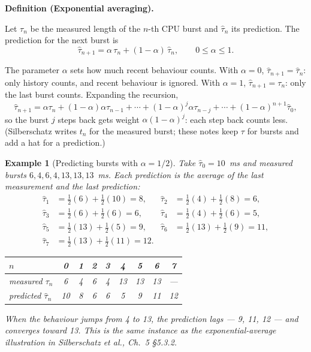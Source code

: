 \documentclass[11pt]{article}
\newtheorem{example}{Example}
\newenvironment{definitionbox}[1]{%
  \par\noindent\textbf{Definition (#1).}\ \itshape
}{\par\vspace{0.3em}}
\begin{document}
\begin{definitionbox}{Exponential averaging}
Let $\tau_n$ be the measured length of the $n$-th CPU burst and $\hat{\tau}_n$
its prediction. The prediction for the next burst is
\[
  \hat{\tau}_{n+1} = \alpha\,\tau_n + (1-\alpha)\,\hat{\tau}_n ,
  \qquad 0 \le \alpha \le 1 .
\]
\end{definitionbox}

The parameter $\alpha$ sets how much recent behaviour counts. With $\alpha = 0$,
$\hat{\tau}_{n+1} = \hat{\tau}_n$: only history counts, and recent behaviour is
ignored. With $\alpha = 1$, $\hat{\tau}_{n+1} = \tau_n$: only the last burst
counts. Expanding the recursion,
\[
  \hat{\tau}_{n+1} = \alpha\tau_n + (1-\alpha)\alpha\tau_{n-1} + \cdots
    + (1-\alpha)^j\alpha\tau_{n-j} + \cdots + (1-\alpha)^{n+1}\hat{\tau}_0 ,
\]
so the burst $j$ steps back gets weight $\alpha(1-\alpha)^j$: each step back
counts less. (Silberschatz writes $t_n$ for the measured burst; these notes keep
$\tau$ for bursts and add a hat for a prediction.)

\begin{example}[Predicting bursts with $\alpha = 1/2$]
\label{ex:ema}
Take $\hat{\tau}_0 = 10$~ms and measured bursts $6, 4, 6, 4, 13, 13, 13$~ms. Each
prediction is the average of the last measurement and the last prediction:
\begin{align*}
  \hat{\tau}_1 &= \tfrac12(6) + \tfrac12(10) = 8, &
  \hat{\tau}_2 &= \tfrac12(4) + \tfrac12(8) = 6, \\
  \hat{\tau}_3 &= \tfrac12(6) + \tfrac12(6) = 6, &
  \hat{\tau}_4 &= \tfrac12(4) + \tfrac12(6) = 5, \\
  \hat{\tau}_5 &= \tfrac12(13) + \tfrac12(5) = 9, &
  \hat{\tau}_6 &= \tfrac12(13) + \tfrac12(9) = 11, \\
  \hat{\tau}_7 &= \tfrac12(13) + \tfrac12(11) = 12. &&
\end{align*}

\begin{center}
\begin{tabular}{lcccccccc}
  \toprule
  $n$ & 0 & 1 & 2 & 3 & 4 & 5 & 6 & 7 \\
  \midrule
  measured $\tau_n$ & 6 & 4 & 6 & 4 & 13 & 13 & 13 & --- \\
  predicted $\hat{\tau}_n$ & 10 & 8 & 6 & 6 & 5 & 9 & 11 & 12 \\
  \bottomrule
\end{tabular}
\end{center}

\noindent When the behaviour jumps from 4 to 13, the prediction lags --- 9, 11,
12 --- and converges toward 13. This is the same instance as the
exponential-average illustration in Silberschatz et al., Ch.~5 \S5.3.2.
\end{example}
\end{document}
